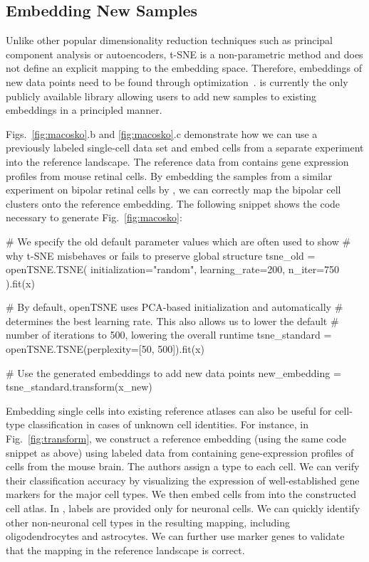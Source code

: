 \documentclass[article]{jss}
\newcommand{\opentsne}{\pkg{openTSNE}\xspace}
\begin{document}
\subsection{Embedding New Samples}

Unlike other popular dimensionality reduction techniques such as principal component analysis or autoencoders, t-SNE is a non-parametric method and does not define an explicit mapping to the embedding space. Therefore, embeddings of new data points need to be found through optimization~\citep{policar2021embedding}. \opentsne is currently the only publicly available library allowing users to add new samples to existing embeddings in a principled manner.

Figs.~\ref{fig:macosko}.b and \ref{fig:macosko}.c demonstrate how we can use a previously labeled single-cell data set and embed cells from a separate experiment into the reference landscape. The reference data from \citet{macosko2015highly} contains gene expression profiles from mouse retinal cells. By embedding the samples from a similar experiment on bipolar retinal cells by \citet{shekhar2016comprehensive}, we can correctly map the bipolar cell clusters onto the reference embedding. The following snippet shows the code necessary to generate Fig.~\ref{fig:macosko}:
\begin{CodeChunk}
\begin{CodeInput}
# We specify the old default parameter values which are often used to show
# why t-SNE misbehaves or fails to preserve global structure
tsne_old = openTSNE.TSNE(
    initialization="random", learning_rate=200, n_iter=750
).fit(x)

# By default, openTSNE uses PCA-based initialization and automatically
# determines the best learning rate. This also allows us to lower the default
# number of iterations to 500, lowering the overall runtime
tsne_standard = openTSNE.TSNE(perplexity=[50, 500]).fit(x)

# Use the generated embeddings to add new data points
new_embedding = tsne_standard.transform(x_new)
\end{CodeInput}
\end{CodeChunk}

Embedding single cells into existing reference atlases can also be useful for cell-type classification in cases of unknown cell identities. For instance, in Fig.~\ref{fig:transform}, we construct a reference embedding (using the same code snippet as above) using labeled data from \citet{hochgerner2018conserved} containing gene-expression profiles of cells from the mouse brain. The authors assign a type to each cell. We can verify their classification accuracy by visualizing the expression of well-established gene markers for the major cell types. We then embed cells from \citet{harris2018classes} into the constructed cell atlas. In \citet{harris2018classes}, labels are provided only for neuronal cells. We can quickly identify other non-neuronal cell types in the resulting mapping, including oligodendrocytes and astrocytes. We can further use marker genes to validate that the mapping in the reference landscape is correct.
\end{document}
